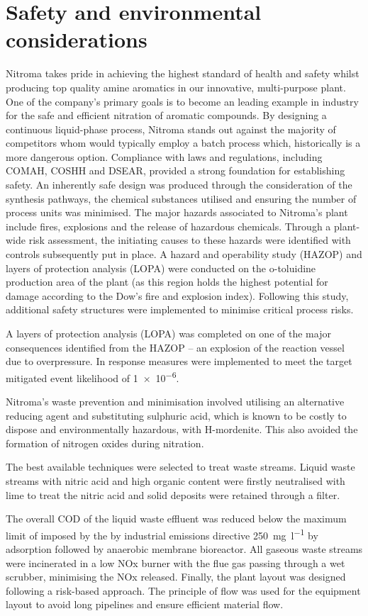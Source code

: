 \section*{Safety and environmental considerations}

Nitroma takes pride in achieving the highest standard of health and safety whilst producing top quality amine aromatics in our innovative, multi-purpose plant. One of the company's primary goals is to become an leading example in industry for the safe and efficient nitration of aromatic compounds. By designing a continuous liquid-phase process, Nitroma stands out against the majority of competitors whom would typically employ a batch process which, historically is a more dangerous option. Compliance with laws and regulations, including COMAH, COSHH and DSEAR, provided a strong foundation for establishing safety. An inherently safe design was produced through the consideration of the synthesis pathways, the chemical substances utilised and ensuring the number of process units was minimised. The major hazards associated to Nitroma's plant include fires, explosions and the release of hazardous chemicals. Through a plant-wide risk assessment, the initiating causes to these hazards were identified with controls subsequently put in place. A hazard and operability study (HAZOP) and layers of protection analysis (LOPA) were conducted on the o-toluidine production area of the plant (as this region holds the highest potential for damage according to the Dow's fire and explosion index). Following this study, additional safety structures were implemented to minimise critical process risks. 

A layers of protection analysis (LOPA) was completed on one of the major consequences identified from the HAZOP – an explosion of the reaction vessel due to overpressure. In response measures were implemented to meet the target mitigated event likelihood of \num{1e-6}.

Nitroma's waste prevention and minimisation involved utilising an alternative reducing agent and substituting sulphuric acid, which is known to be costly to dispose and environmentally hazardous, with H-mordenite. This also avoided the formation of nitrogen oxides during nitration.

The best available techniques  were selected to treat waste streams. Liquid waste streams with nitric acid and high organic content were firstly neutralised with lime to treat the nitric acid and solid deposits were retained through a filter. 

The overall COD of the liquid waste effluent was reduced below the maximum limit of imposed by the by industrial emissions directive \SI{250}{\mg\per\litre} by adsorption followed by anaerobic membrane bioreactor. All gaseous waste streams were incinerated in a low NOx burner with the flue gas passing through a wet scrubber, minimising the NOx released. Finally, the plant layout was designed following a risk-based approach. The principle of flow was used for the equipment layout to avoid long pipelines and ensure efficient material flow. 




